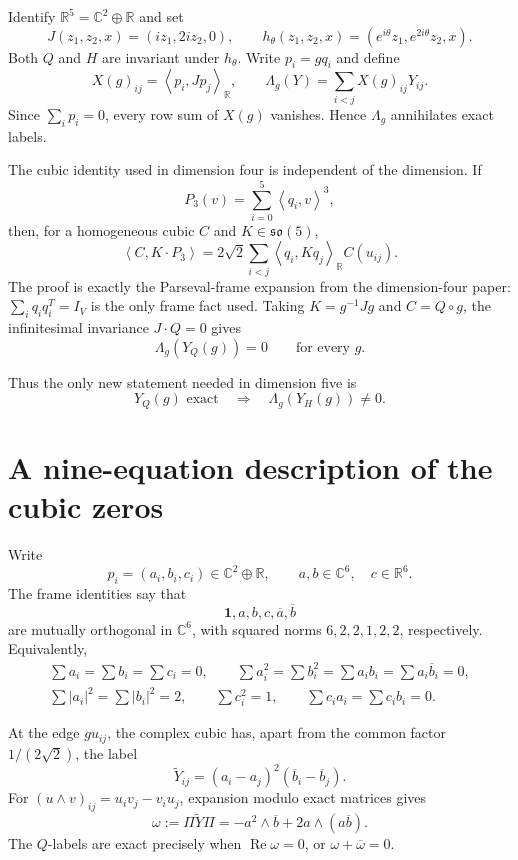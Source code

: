 \documentclass[11pt,reqno]{amsart}
\theoremstyle{remark}
\newcommand{\R}{\mathbb R}
\newcommand{\C}{\mathbb C}
\newcommand{\one}{\mathbf 1}
\newcommand{\ip}[2]{\left\langle #1,#2\right\rangle}
\newcommand{\abs}[1]{\left\lvert #1\right\rvert}
\begin{document}
Identify $\R^5=\C^2\oplus\R$ and set
\[
 J(z_1,z_2,x)=(iz_1,2iz_2,0),\qquad
 h_\theta(z_1,z_2,x)=(e^{i\theta}z_1,e^{2i\theta}z_2,x).
\]
Both $Q$ and $H$ are invariant under $h_\theta$.  Write $p_i=gq_i$ and define
\[
 X(g)_{ij}=\ip{p_i}{Jp_j}_{\R},\qquad
 \Lambda_g(Y)=\sum_{i<j}X(g)_{ij}Y_{ij}.
\]
Since $\sum_i p_i=0$, every row sum of $X(g)$ vanishes.  Hence
$\Lambda_g$ annihilates exact labels.

The cubic identity used in dimension four is independent of the dimension.
If
\[
 P_3(v)=\sum_{i=0}^5\ip{q_i}{v}^3,
\]
then, for a homogeneous cubic $C$ and $K\in\mathfrak{so}(5)$,
\begin{equation}\label{eq:cubicidentity}
 \ip{C}{K\cdot P_3}
 =2\sqrt2\sum_{i<j}\ip{q_i}{Kq_j}_{\R}C(u_{ij}).
\end{equation}
The proof is exactly the Parseval-frame expansion from the dimension-four
paper: $\sum_iq_iq_i^T=I_V$ is the only frame fact used.  Taking
$K=g^{-1}Jg$ and $C=Q\circ g$, the infinitesimal invariance $J\cdot Q=0$
gives
\begin{equation}\label{eq:globalzero}
 \Lambda_g(Y_Q(g))=0\qquad\text{for every }g.
\end{equation}

Thus the only new statement needed in dimension five is
\begin{equation}\label{eq:target}
 Y_Q(g)\text{ exact}\quad\Longrightarrow\quad
 \Lambda_g(Y_H(g))\ne0.
\end{equation}

\section{A nine-equation description of the cubic zeros}

Write
\[
 p_i=(a_i,b_i,c_i)\in\C^2\oplus\R,
 \qquad a,b\in\C^6,\quad c\in\R^6.
\]
The frame identities say that
\[
 \one,a,b,c,\overline a,\overline b
\]
are mutually orthogonal in $\C^6$, with squared norms
$6,2,2,1,2,2$, respectively.  Equivalently,
\begin{gather*}
 \sum a_i=\sum b_i=\sum c_i=0,\qquad
 \sum a_i^2=\sum b_i^2=\sum a_ib_i=\sum a_i\overline b_i=0,\\
 \sum\abs{a_i}^2=\sum\abs{b_i}^2=2,\qquad
 \sum c_i^2=1,\qquad
 \sum c_ia_i=\sum c_ib_i=0.
\end{gather*}

At the edge $gu_{ij}$, the complex cubic has, apart from the common factor
$1/(2\sqrt2)$, the label
\[
 \widetilde Y_{ij}=(a_i-a_j)^2(\overline b_i-\overline b_j).
\]
For $(u\wedge v)_{ij}=u_iv_j-v_iu_j$, expansion modulo exact matrices gives
\begin{equation}\label{eq:omega}
 \omega:=\Pi\widetilde Y\Pi
 =-a^2\wedge\overline b+2a\wedge(a\overline b).
\end{equation}
The $Q$-labels are exact precisely when
$\operatorname{Re}\omega=0$, or $\omega+\overline\omega=0$.
\end{document}
